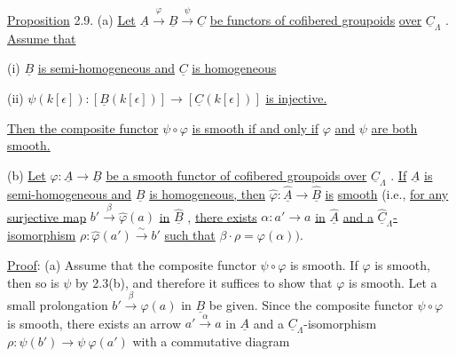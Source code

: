 \underline{Proposition} 2.9.  (a)  \underline{Let}  $\underline{A} \xrightarrow{\ \varphi\ } \underline{B} \xrightarrow{\ \psi\ } \underline{C}$  \underline{be functors of cofibered groupoids} \underline{over}  $\underline{C}_{\Lambda}$  . \underline{Assume that}

(i)  $\underline{B}$  \underline{is semi-homogeneous and}  $\underline{C}$  \underline{is homogeneous}

(ii)  $\psi(k[\epsilon]) : [\underline{B}(k[\epsilon])] \longrightarrow [\underline{C}(k[\epsilon])]$  \underline{is injective.}

\underline{Then the composite functor}  $\psi \circ \varphi$  \underline{is smooth if and only if}  $\varphi$  \underline{and}  $\psi$  \underline{are both}
\underline{smooth.}

(b)  \underline{Let} $\varphi : \underline{A} \longrightarrow \underline{B}$ \underline{be a smooth functor of cofibered groupoids over} $\underline{C}_{\Lambda}$ . \underline{If} $\underline{A}$ \underline{is semi-homogeneous and} $\underline{B}$ \underline{is homogeneous, then} $\widehat{\varphi} : \widehat{\underline{A}} \to \widehat{\underline{B}}$ \underline{is} \underline{smooth} (i.e., \underline{for any surjective map} $b' \xrightarrow{\ \beta\ } \widehat{\varphi}(a)$ \underline{in} $\widehat{\underline{B}}$ , \underline{there exists} $\alpha : a' \to a$ \underline{in} $\widehat{\underline{A}}$ \underline{and a} $\widehat{\underline{C}}_{\Lambda}$\underline{-isomorphism} $\rho : \widehat{\varphi}(a') \xrightarrow{\ \sim\ } b'$ \underline{such that} $\beta \cdot \rho = \varphi(\alpha))$.

\underline{Proof}: (a)  Assume that the composite functor $\psi \circ \varphi$ is smooth. If $\varphi$ is smooth, then so is $\psi$ by 2.3(b), and therefore it suffices to show that $\varphi$ is smooth. Let a small prolongation $b' \xrightarrow{\ \beta\ } \varphi(a)$ in $\underline{B}$ be given. Since the composite functor $\psi \circ \varphi$ is smooth, there exists an arrow $a' \xrightarrow{\ \alpha\ } a$ in $\underline{A}$ and a $\underline{C}_{\Lambda}$-isomorphism $\rho : \psi(b') \longrightarrow \psi\ \varphi(a')$ with a commutative diagram

